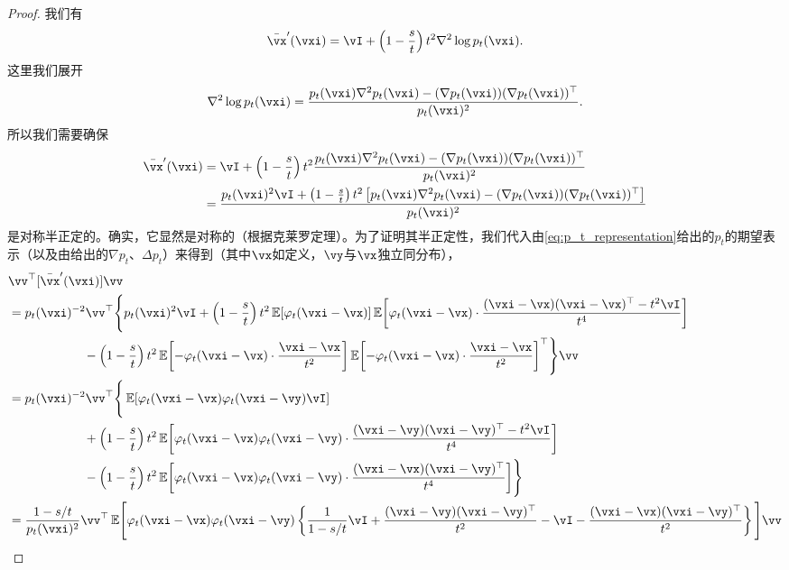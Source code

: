 \documentclass[../../book-main.tex]{subfiles}
\begin{document}
\begin{proof}
    我们有
    \begin{equation}
        \bar{\vx}^{\prime}(\vxi) = \vI + \bp{1 - \frac{s}{t}}t^{2}\nabla^{2}\log p_{t}(\vxi).
    \end{equation}
    这里我们展开
    \begin{equation}
        \nabla^{2}\log p_{t}(\vxi) = \frac{p_{t}(\vxi)\nabla^{2}p_{t}(\vxi) - (\nabla p_{t}(\vxi))(\nabla p_{t}(\vxi))^{\top}}{p_{t}(\vxi)^{2}}.
    \end{equation}
    所以我们需要确保
    \begin{align}
        \bar{\vx}^{\prime}(\vxi)
        &= \vI + \bp{1 - \frac{s}{t}}t^{2}\frac{p_{t}(\vxi)\nabla^{2}p_{t}(\vxi) - (\nabla p_{t}(\vxi))(\nabla p_{t}(\vxi))^{\top}}{p_{t}(\vxi)^{2}} \\
        &= \frac{p_{t}(\vxi)^{2}\vI + \bp{1 - \frac{s}{t}}t^{2}\bs{p_{t}(\vxi)\nabla^{2}p_{t}(\vxi) - (\nabla p_{t}(\vxi))(\nabla p_{t}(\vxi))^{\top}}}{p_{t}(\vxi)^{2}}
    \end{align}
    是对称半正定的。确实，它显然是对称的（根据克莱罗定理）。为了证明其半正定性，我们代入由\eqref{eq:p_t_representation}给出的\(p_{t}\)的期望表示（以及由给出的\(\nabla p_{t}\)、\(\Delta p_{t}\)）来得到（其中\(\vx\)如定义，\(\vy\)与\(\vx\)独立同分布），
    \begin{align}
        &\vv^{\top}[\bar{\vx}^{\prime}(\vxi)]\vv \\
        &= p_{t}(\vxi)^{-2}\vv^{\top}\Bigg\{p_{t}(\vxi)^{2}\vI + \bp{1 - \frac{s}{t}}t^{2}\Ex[\phi_{t}(\vxi - \vx)]\Ex\rs{\phi_{t}(\vxi - \vx)\cdot\frac{(\vxi - \vx)(\vxi - \vx)^{\top} - t^{2}\vI}{t^{4}}} \\
        & \qquad \qquad \qquad -\bp{1 - \frac{s}{t}}t^{2}\Ex\rs{-\phi_{t}(\vxi - \vx)\cdot\frac{\vxi - \vx}{t^{2}}}\Ex\rs{-\phi_{t}(\vxi - \vx)\cdot\frac{\vxi - \vx}{t^{2}}}^{\top}\Bigg\}\vv \\
        &= p_{t}(\vxi)^{-2}\vv^{\top}\Bigg\{\Ex[\phi_{t}(\vxi - \vx)\phi_{t}(\vxi - \vy)\vI] \\
        & \qquad \qquad \qquad + \bp{1 - \frac{s}{t}}t^{2}\Ex\rs{\phi_{t}(\vxi - \vx)\phi_{t}(\vxi - \vy)\cdot\frac{(\vxi - \vy)(\vxi - \vy)^{\top} - t^{2}\vI}{t^{4}}} \\
        & \qquad \qquad \qquad -\bp{1 - \frac{s}{t}}t^{2}\Ex\rs{\phi_{t}(\vxi - \vx)\phi_{t}(\vxi - \vy)\cdot\frac{(\vxi - \vx)(\vxi - \vy)^{\top}}{t^{4}}}\Bigg\} \\ 
        &= \frac{1 - s/t}{p_{t}(\vxi)^{2}}\vv^{\top}\Ex\mathopen{}\Bigg[\phi_{t}(\vxi - \vx)\phi_{t}(\vxi - \vy)\bc{\frac{1}{1 - s/t}\vI + \frac{(\vxi - \vy)(\vxi - \vy)^{\top}}{t^{2}} - \vI - \frac{(\vxi - \vx)(\vxi - \vy)^{\top}}{t^{2}}}\Bigg]\vv \\

\end{align}
\end{proof}
\end{document}
